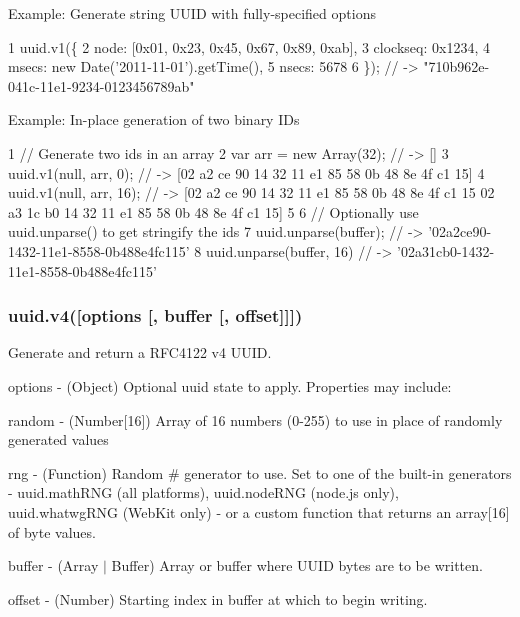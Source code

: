 Example\+: Generate string U\+U\+I\+D with fully-\/specified options


\begin{DoxyCode}
1 uuid.v1(\{
2   node: [0x01, 0x23, 0x45, 0x67, 0x89, 0xab],
3   clockseq: 0x1234,
4   msecs: new Date('2011-11-01').getTime(),
5   nsecs: 5678
6 \});   // -> "710b962e-041c-11e1-9234-0123456789ab"
\end{DoxyCode}


Example\+: In-\/place generation of two binary I\+Ds


\begin{DoxyCode}
1 // Generate two ids in an array
2 var arr = new Array(32); // -> []
3 uuid.v1(null, arr, 0);   // -> [02 a2 ce 90 14 32 11 e1 85 58 0b 48 8e 4f c1 15]
4 uuid.v1(null, arr, 16);  // -> [02 a2 ce 90 14 32 11 e1 85 58 0b 48 8e 4f c1 15 02 a3 1c b0 14 32 11 e1 85
       58 0b 48 8e 4f c1 15]
5 
6 // Optionally use uuid.unparse() to get stringify the ids
7 uuid.unparse(buffer);    // -> '02a2ce90-1432-11e1-8558-0b488e4fc115'
8 uuid.unparse(buffer, 16) // -> '02a31cb0-1432-11e1-8558-0b488e4fc115'
\end{DoxyCode}


\subsubsection*{uuid.\+v4(\mbox{[}{\ttfamily options} \mbox{[}, {\ttfamily buffer} \mbox{[}, {\ttfamily offset}\mbox{]}\mbox{]}\mbox{]})}

Generate and return a R\+F\+C4122 v4 U\+U\+I\+D.


\begin{DoxyItemize}
\item {\ttfamily options} -\/ (Object) Optional uuid state to apply. Properties may include\+:
\begin{DoxyItemize}
\item {\ttfamily random} -\/ (Number\mbox{[}16\mbox{]}) Array of 16 numbers (0-\/255) to use in place of randomly generated values
\item {\ttfamily rng} -\/ (Function) Random \# generator to use. Set to one of the built-\/in generators -\/ {\ttfamily uuid.\+math\+R\+N\+G} (all platforms), {\ttfamily uuid.\+node\+R\+N\+G} (node.\+js only), {\ttfamily uuid.\+whatwg\+R\+N\+G} (Web\+Kit only) -\/ or a custom function that returns an array\mbox{[}16\mbox{]} of byte values.
\end{DoxyItemize}
\item {\ttfamily buffer} -\/ (Array $\vert$ Buffer) Array or buffer where U\+U\+I\+D bytes are to be written.
\item {\ttfamily offset} -\/ (Number) Starting index in {\ttfamily buffer} at which to begin writing.
\end{DoxyItemize}

